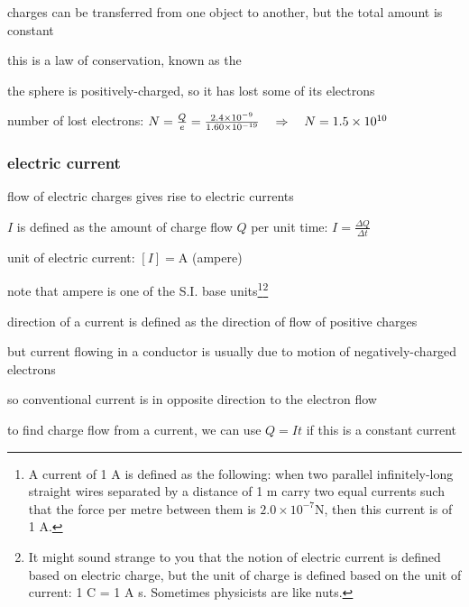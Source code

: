 charges can be transferred from one object to another, but the total amount is constant

this is a law of conservation, known as the 



\sol the sphere is positively-charged, so it has lost some of its electrons

number of lost electrons: $ N = \frac{Q}{e} = \frac{2.4\times10^{-9}}{1.60 \times10^{-19}} \quad \Rightarrow \quad N = 1.5 \times 10^{10}  $ \eoe



\subsubsection{electric current}

flow of electric charges gives rise to electric currents

\begin{ilight}
	 $I$ is defined as the amount of charge flow $Q$ per unit time: $ \boxed{I=\frac{\Delta Q}{\Delta t}} $
\end{ilight}


\cmt unit of electric current: $[I] = \text{A}$ (ampere)

note that ampere is one of the S.I. base units\footnote{A current of 1 A is defined as the following: when two parallel infinitely-long straight wires separated by a distance of 1 m carry two equal currents such that the force per metre between them is $2.0\times10^{-7}$N, then this current is of 1 A.}\footnote{It might sound strange to you that the notion of electric current is defined based on electric charge, but the unit of charge is defined based on the unit of current: 1 C = 1 A s. Sometimes physicists are like nuts.}

\cmt direction of a current is defined as the direction of flow of positive charges

but current flowing in a conductor is usually due to motion of negatively-charged electrons

so conventional current is in opposite direction to the electron flow

\cmt to find charge flow from a current, we can use  $Q=It$ if this is a constant current

